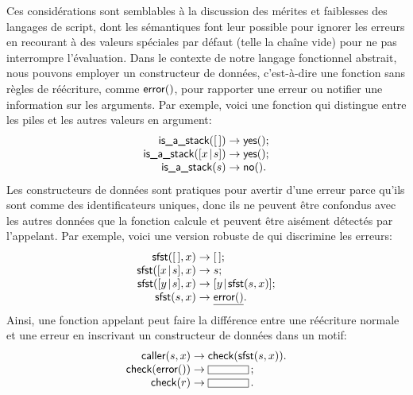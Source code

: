 Ces considérations sont semblables à la discussion des mérites et
faiblesses des langages de script, dont les sémantiques font leur
possible pour ignorer les erreurs en recourant à des valeurs spéciales
par défaut (telle la chaîne vide) pour ne pas interrompre
l'évaluation. Dans le contexte de notre langage fonctionnel abstrait,
nous pouvons employer un constructeur de données, c'est-à-dire une
fonction sans règles de réécriture, comme \(\textsf{error}()\), pour
rapporter une erreur ou notifier une information sur les
arguments. Par exemple, voici une fonction qui distingue entre les
piles et les autres valeurs en argument:
\begin{equation*}
\begin{array}{r@{\;}l@{\;}l}
\fun{is\_a\_stack}(\el) & \rightarrow & \fun{yes}();\\
\fun{is\_a\_stack}(\cons{x}{s}) & \rightarrow & \fun{yes}();\\
\fun{is\_a\_stack}(s) & \rightarrow & \fun{no}().
\end{array}
\end{equation*}
Les constructeurs de données sont pratiques pour avertir d'une erreur
parce qu'ils sont comme des identificateurs uniques, donc ils ne
peuvent être confondus avec les autres données que la fonction calcule
et peuvent être aisément détectés par l'appelant. Par exemple, voici
une version robuste de  qui discrimine
les erreurs:
\begin{equation*}
\begin{array}{r@{\;}l@{\;}l}
\fun{sfst}(\el, x) & \rightarrow & \el;\\
\fun{sfst}(\cons{x}{s},x) & \rightarrow & s;\\
\fun{sfst}(\cons{y}{s},x) & \rightarrow & \cons{y}{\fun{sfst}(s,x)};\\
\fun{sfst}(s,x) & \rightarrow & \underline{\fun{error}()}.
\end{array}
\end{equation*}
Ainsi, une fonction appelant  peut faire la différence
entre une réécriture normale et une erreur en inscrivant un
constructeur de données dans un motif:
\begin{equation*}
\begin{array}{r@{\;}l@{\;}l}
\fun{caller}(s,x) & \rightarrow & \fun{check}(\fun{sfst}(s,x)).\\
\fun{check}(\fun{error}()) & \rightarrow & \fbcode{CCCCC}\,;\\
\fun{check}(r) & \rightarrow & \fbcode{CCCCC}\,.
\end{array}
\end{equation*}

